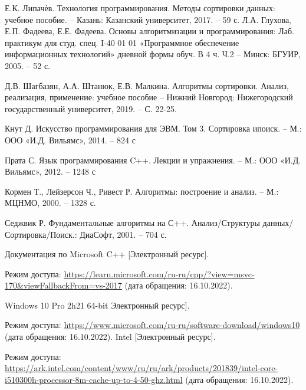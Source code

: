 \renewcommand\bibname{Список используемых источников} %

\begin{thebibliography}{}
	\label{bib:book_lipachev}
	Е.К. Липачѐв. Технология программирования. Методы сортировки данных: учебное
	пособие. – Казань: Казанский университет, 2017. – 59 с.
	Л.А. Глухова, Е.П. Фадеева, Е.Е. Фадеева. Основы алгоритмизации и программирования: Лаб. практикум для студ. спец. I-40 01 01 «Программное обеспечение информационных технологий» дневной формы обуч. В 4 ч. Ч.2 – Минск: БГУИР, 2005. – 52 с.
	
	\label{bib:book_sort_algorithms}
	Д.В. Шагбазян, А.А. Штанюк, Е.В. Малкина. Алгоритмы сортировки. Анализ, реализация, применение: учебное пособие – Нижний Новгород: Нижегородский государственный университет, 2019. – С. 22-25.
	
	\label{bib:book_knut}
	Кнут Д. Искусство программирования для ЭВМ. Том 3. Сортировка ипоиск. – М.: ООО «И.Д. Вильямс», 2014. – 824 с
	
	\label{bib:book_prat}
	Прата С. Язык программирования C++. Лекции и упражнения. – М.:
	ООО «И.Д. Вильямс», 2012. – 1248 с
	
	\label{bib:book_kormen}
	Кормен Т., Лейзерсон Ч., Ривест Р. Алгоритмы: построение и анализ. – М.: МЦНМО, 2000. – 1328 с.
	
	\label{bib:book_sejik}
	Седжвик Р. Фундаментальные алгоритмы на С++. Анализ/Структуры данных/Сортировка/Поиск.: ДиаСофт, 2001. – 704 с.
	
	\label{bib:сpp}
	Документация по Microsoft C++ [Электронный ресурс]. 
	
	Режим доступа: \url{https://learn.microsoft.com/ru-ru/cpp/?view=msvc-170&viewFallbackFrom=vs-2017} (дата обращения: 16.10.2022).
	
	\label{bib:windows}
	Windows 10 Pro 2h21 64-bit  Электронный ресурс]. 
	
	Режим доступа: \url{https://www.microsoft.com/ru-ru/software-download/windows10} (дата обращения: 16.10.2022).
	\label{bib:intel}
	Intel [Электронный ресурс]. 
	
	Режим доступа: \url{https://ark.intel.com/content/www/ru/ru/ark/products/201839/intel-core-i510300h-processor-8m-cache-up-to-4-50-ghz.html} (дата обращения: 16.10.2022).
\end{thebibliography}